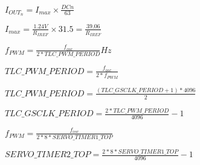 \documentclass{article}
\begin{document}
$\displaystyle I_{OUT_n} = I_{max} \times \frac{DCn}{63} $
\pagebreak

$\displaystyle I_{max} = \frac{1.24V}{R_{IREF}} \times 31.5 = \frac{39.06}{R_{IREF}} $
\pagebreak

$\displaystyle f_{PWM} = \frac{f_{osc}}{2 * TLC\_PWM\_PERIOD} Hz $
\pagebreak

$\displaystyle TLC\_PWM\_PERIOD = \frac{f_{osc}}{2 * f_{PWM}} $
\pagebreak

$\displaystyle TLC\_PWM\_PERIOD = \frac{(TLC\_GSCLK\_PERIOD + 1) * 4096}{2} $
\pagebreak

$\displaystyle TLC\_GSCLK\_PERIOD = \frac{2 * TLC\_PWM\_PERIOD}{4096} - 1 $
\pagebreak

$\displaystyle f_{PWM} = \frac{f_{osc}}{2 * 8 * SERVO\_TIMER1\_TOP} $
\pagebreak

$\displaystyle SERVO\_TIMER2\_TOP = \frac{2 * 8 * SERVO\_TIMER1\_TOP}{4096} - 1 $
\pagebreak
\end{document}
